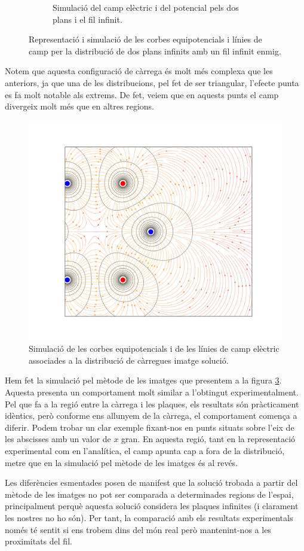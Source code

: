 \documentclass[a4paper,10.5pt]{report}
\begin{document}
\begin{figure}[h]
\begin{subfigure}{0.49\linewidth}
		\caption{Simulació del camp elèctric i del potencial pels dos plans i el fil infinit.}
		\label{fig:1.4b}
	\end{subfigure}
	\caption{Representació i simulació de les corbes equipotencials i línies de camp per la distribució de dos plans infinits amb un fil infinit enmig.}
	\label{fig:1.4}
\end{figure}

Notem que aquesta configuració de càrrega és molt més complexa que les anteriors, ja que una de les distribucions, pel fet de ser triangular, l'efecte punta es fa molt notable als extrems. De fet, veiem que en aquests punts el camp divergeix molt més que en altres regions.

\begin{figure}[h]
	\centering
	\includegraphics[width=0.45\linewidth]{figV2imagenes}
	\caption{Simulació de les corbes equipotencials i de les línies de camp elèctric associades a la distribució de càrregues imatge solució.}
	\label{fig:1.5}
\end{figure}

Hem fet la simulació pel mètode de les imatges que presentem a la figura \ref{fig:1.5}. Aquesta presenta un comportament molt similar a l'obtingut experimentalment. Pel que fa a la regió entre la càrrega i les plaques, els resultats són pràcticament idèntics, però conforme ens allunyem de la càrrega, el comportament comença a diferir. Podem trobar un clar exemple fixant-nos en punts situats sobre l'eix de les abscisses amb un valor de $x$ gran. En aquesta regió, tant en la representació experimental com en l'analítica, el camp apunta cap a fora de la distribució, metre que en la simulació pel mètode de les imatges és al revés.

Les diferències esmentades posen de manifest que la solució trobada a partir del mètode de les imatges no pot ser comparada a determinades regions de l'espai, principalment perquè aquesta solució considera les plaques infinites (i clarament les nostres no ho són). Per tant, la comparació amb els  resultats experimentals només té sentit si ens trobem dins del món real però mantenint-nos a les proximitats del fil.
\end{document}
